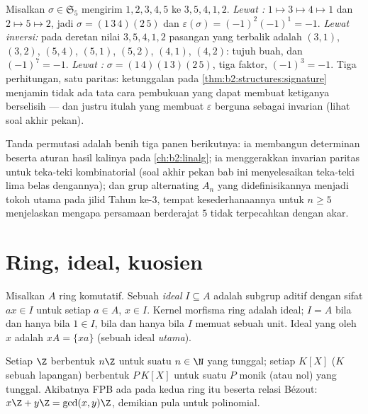 \begin{example}\label{ex:b2:structures:threeroads}
Misalkan $\sigma \in \mathfrak{S}_5$ mengirim $1, 2, 3, 4, 5$ ke $3, 5, 4,
1, 2$. \emph{Lewat :} $1 \mapsto 3 \mapsto 4 \mapsto 1$ dan $2
\mapsto 5 \mapsto 2$, jadi $\sigma = (1\,3\,4)(2\,5)$ dan
$\varepsilon(\sigma) = (-1)^{2}(-1)^{1} = -1$. \emph{Lewat
inversi:} pada deretan nilai $3, 5, 4, 1, 2$ pasangan yang terbalik
adalah $(3,1)$, $(3,2)$, $(5,4)$, $(5,1)$, $(5,2)$, $(4,1)$,
$(4,2)$: tujuh buah, dan $(-1)^7 = -1$. \emph{Lewat
:} $\sigma = (1\,4)(1\,3)(2\,5)$, tiga faktor,
$(-1)^3 = -1$. Tiga perhitungan, satu paritas: ketunggalan pada
\cref{thm:b2:structures:signature} menjamin tidak ada tata cara
pembukuan yang dapat membuat ketiganya berselisih --- dan justru itulah
yang membuat $\varepsilon$ berguna sebagai invarian (lihat soal akhir pekan).
\end{example}

\begin{remark}
Tanda permutasi adalah benih tiga panen berikutnya: ia membangun
determinan beserta aturan hasil kalinya pada \cref{ch:b2:linalg}; ia
menggerakkan invarian paritas untuk teka-teki kombinatorial (soal akhir
pekan bab ini menyelesaikan teka-teki lima belas dengannya); dan grup
alternating $A_n$ yang didefinisikannya menjadi tokoh utama pada jilid
Tahun ke-3, tempat kesederhanaannya untuk $n \geq 5$ menjelaskan
mengapa persamaan berderajat $5$ tidak terpecahkan dengan akar.
\end{remark}

\section{Ring, ideal, kuosien}

\begin{definition}[Ideal]\label{def:b2:structures:ideal}
Misalkan $A$ ring komutatif. Sebuah \emph{ideal} $I
\subseteq A$ adalah subgrup aditif dengan sifat $a x \in I$ untuk setiap
$a \in A$, $x \in I$. Kernel morfisma ring adalah ideal; $I = A$ bila dan
hanya bila $1 \in I$, bila dan hanya bila $I$ memuat sebuah unit. Ideal
yang \emph{} oleh $x$ adalah $xA = \{xa\}$ (sebuah ideal
\emph{utama}).
\end{definition}

\begin{theorem}\label{thm:b2:structures:principal}
Setiap  $\Z$ berbentuk $n\Z$ untuk suatu $n \in \N$ yang tunggal;
setiap  $K[X]$ ($K$ sebuah lapangan) berbentuk $P\,K[X]$ untuk suatu
$P$ monik (atau nol) yang tunggal. Akibatnya FPB ada pada kedua ring itu
beserta relasi Bézout: $x\Z + y\Z = \gcd(x,y)\Z$, demikian pula untuk
polinomial.
\end{theorem}


